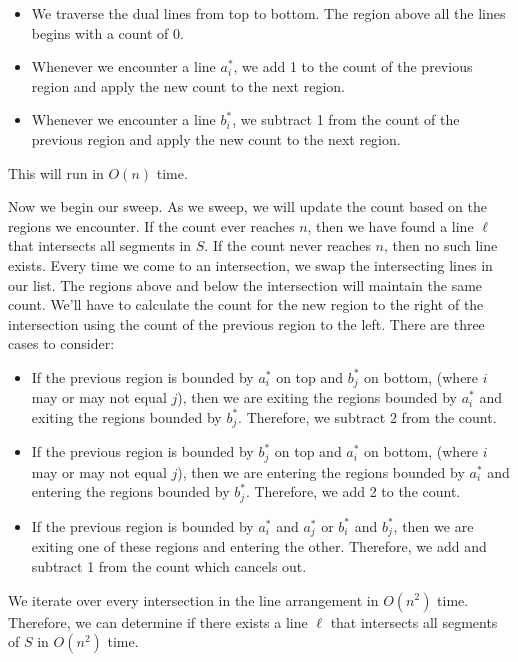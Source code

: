 \documentclass[11pt]{article}
\begin{document}
\begin{enumerate}[(a)]
\begin{solution}
  \begin{itemize}
    \item We traverse the dual lines from top to bottom. The region above all the lines begins with a count of 0.
    \item Whenever we encounter a line \(a^*_i\), we add 1 to the count of the previous region and apply the new count to the next region.
    \item Whenever we encounter a line \(b^*_i\), we subtract 1 from the count of the previous region and apply the new count to the next region.
  \end{itemize}

  This will run in \(O(n)\) time.

  Now we begin our sweep. As we sweep, we will update the count based on the regions we encounter. If the count ever reaches \(n\), then we have found a line \(\ell\) that
  intersects all segments in \(S\). If the count never reaches \(n\), then no such line exists. Every time we come to an intersection, we swap the intersecting lines in our list.
  The regions above and below the intersection will maintain the same count. We'll have to calculate the count for the new region to the right of the intersection using the count
  of the previous region to the left. There are three cases to consider:

  \begin{itemize}
    \item[1.] If the previous region is bounded by \(a^*_i\) on top and \(b^*_j\) on bottom, (where \(i\) may or may not equal \(j\)), then we are exiting the regions bounded by \(a^*_i\) and exiting the
          regions bounded by \(b^*_j\). Therefore, we subtract 2 from the count.
    \item[2.] If the previous region is bounded by \(b^*_j\) on top and \(a^*_i\) on bottom, (where \(i\) may or may not equal \(j\)), then we are entering the regions bounded by \(a^*_i\) and entering the
          regions bounded by \(b^*_j\). Therefore, we add 2 to the count.
    \item[3.] If the previous region is bounded by \(a^*_i\) and \(a^*_j\) or \(b^*_i\) and \(b^*_j\), then we are exiting one of these regions and entering the other.
          Therefore, we add and subtract 1 from the count which cancels out.
  \end{itemize}

  We iterate over every intersection in the line arrangement in \(O(n^2)\) time. Therefore, we can determine if there exists a line \(\ell\) that intersects all segments of \(S\)
  in \(O(n^2)\) time.
  
\end{solution}
\end{enumerate}
\end{document}
